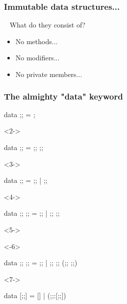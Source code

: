 \documentclass[17pt]{beamer}
\renewcommand{\(}[1]{\begin{columns}[#1]}
\renewcommand{\)}{\end{columns}}
\newcommand{\<}[1]{\begin{column}{#1}}
\renewcommand{\>}{\end{column}}
\begin{document}
\begin{frame}
\frametitle{Immutable data structures...}
\begin{center}
  {~ What do they consist of?}
  \begin{itemize}
  \item<2-> No methods...
  \item<3-> No modifiers...
  \item<4-> No private members...
  \end{itemize}
\end{center}
\end{frame}

\begin{frame}[fragile]
\frametitle{The almighty "data" keyword}
\begin{code}
    data ;;    = ;
\end{code}
\begin{uncoverenv}<2->
\begin{code}
    data ;; = ;; ;;
\end{code}
\end{uncoverenv}
\begin{uncoverenv}<3->
\begin{code}
    data ;;    =   ;; | ;;
\end{code}
\end{uncoverenv}
\begin{uncoverenv}<4->
\begin{code}
    data ;; ;; = ;; | ;; ;;
\end{code}
\end{uncoverenv}
\begin{uncoverenv}<5->
\begin{onlyenv}<-6>
\begin{code}
    data ;;  ;; =     ;; | ;; ;; (;; ;;)
\end{code}
\end{onlyenv}
\begin{onlyenv}<7->
\begin{code}
    data [;;]     =      [] | (;;:[;;])
\end{code}
\end{onlyenv}
\end{uncoverenv}

\end{frame}
\end{document}
